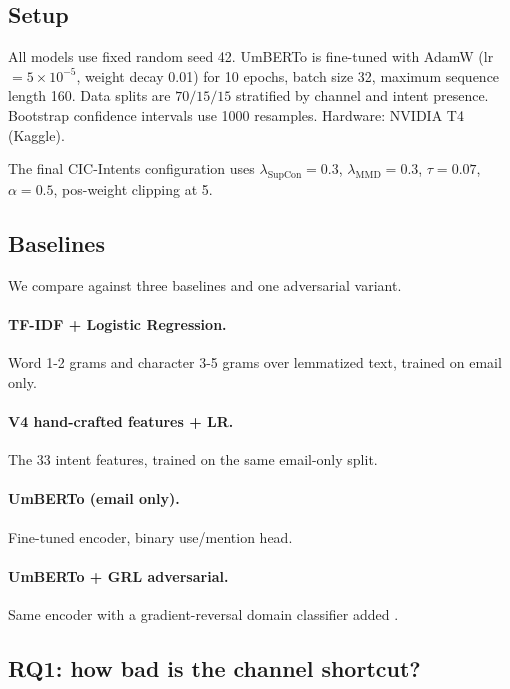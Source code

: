 \documentclass[preprint,12pt,authoryear]{elsarticle}
\begin{document}
\subsection{Setup}

All models use fixed random seed 42. UmBERTo is fine-tuned with
AdamW (lr $= 5 \times 10^{-5}$, weight decay 0.01) for 10 epochs,
batch size 32, maximum sequence length 160. Data splits are
$70/15/15$ stratified by channel and intent presence. Bootstrap
confidence intervals use 1000 resamples. Hardware: NVIDIA T4 (Kaggle).

The final CIC-Intents configuration uses
$\lambda_{\text{SupCon}} = 0.3$, $\lambda_{\text{MMD}} = 0.3$,
$\tau = 0.07$, $\alpha = 0.5$, pos-weight clipping at 5.

\subsection{Baselines}

We compare against three baselines and one adversarial variant.

\paragraph*{TF-IDF + Logistic Regression.} Word 1-2 grams and
character 3-5 grams over lemmatized text, trained on email only.

\paragraph*{V4 hand-crafted features + LR.} The 33 intent features,
trained on the same email-only split.

\paragraph*{UmBERTo (email only).} Fine-tuned encoder, binary
use/mention head.

\paragraph*{UmBERTo + GRL adversarial.} Same encoder with a
gradient-reversal domain classifier added \citep{ganin2016domain}.

\subsection{RQ1: how bad is the channel shortcut?}
\label{sec:rq1}
\end{document}
